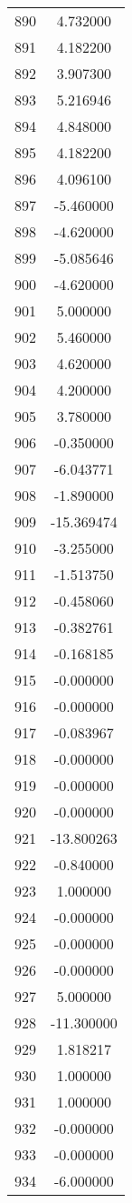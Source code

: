 \documentclass[12pt]{article}
\begin{document}
\begin{longtable}{@{}cc@{}}
890 & 4.732000 \\
891 & 4.182200 \\
892 & 3.907300 \\
893 & 5.216946 \\
894 & 4.848000 \\
895 & 4.182200 \\
896 & 4.096100 \\
897 & -5.460000 \\
898 & -4.620000 \\
899 & -5.085646 \\
900 & -4.620000 \\
901 & 5.000000 \\
902 & 5.460000 \\
903 & 4.620000 \\
904 & 4.200000 \\
905 & 3.780000 \\
906 & -0.350000 \\
907 & -6.043771 \\
908 & -1.890000 \\
909 & -15.369474 \\
910 & -3.255000 \\
911 & -1.513750 \\
912 & -0.458060 \\
913 & -0.382761 \\
914 & -0.168185 \\
915 & -0.000000 \\
916 & -0.000000 \\
917 & -0.083967 \\
918 & -0.000000 \\
919 & -0.000000 \\
920 & -0.000000 \\
921 & -13.800263 \\
922 & -0.840000 \\
923 & 1.000000 \\
924 & -0.000000 \\
925 & -0.000000 \\
926 & -0.000000 \\
927 & 5.000000 \\
928 & -11.300000 \\
929 & 1.818217 \\
930 & 1.000000 \\
931 & 1.000000 \\
932 & -0.000000 \\
933 & -0.000000 \\
934 & -6.000000 \\

\end{longtable}
\end{document}
